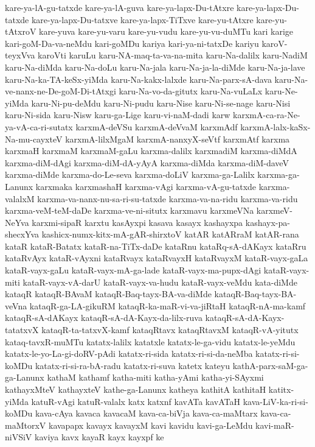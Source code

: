 {kare-ya-lA-gu-tatxde
kare-ya-lA-guva
kare-ya-lapx-Du-tAtxre
kare-ya-lapx-Du-tatxde
kare-ya-lapx-Du-tatxve
kare-ya-lapx-TiTxve
kare-yu-tAtxre
kare-yu-tAtxroV
kare-yuva
kare-yu-varu
kare-yu-vudu
kare-yu-vu-duMTu
kari
karige
kari-goM-Da-va-neMdu
kari-goMDu
kariya
kari-ya-ni-tatxDe
kariyu
karoV-teyxVva
karoVti
karuLu
karu-NA-maq-ta-va-na-mita
karu-Na-dalilx
karu-NadiM
karu-Na-diMda
karu-Na-doLu
karu-Na-jala
karu-Na-ja-la-diMde
karu-Na-ja-lave
karu-Na-ka-TA-keSx-yiMda
karu-Na-kakx-lalxde
karu-Na-parx-sA-dava
karu-Na-ve-nanx-ne-De-goM-Di-tAtxgi
karu-Na-vo-da-gitutx
karu-Na-vuLaLx
karu-Ne-yiMda
karu-Ni-pu-deMdu
karu-Ni-pudu
karu-Nise
karu-Ni-se-nage
karu-Nisi
karu-Ni-sida
karu-Nisw
karu-ga-Lige
karu-vi-naM-dadi
karw
karxmA-ca-ra-Ne-ya-vA-ca-ri-sutatx
karxmA-deVSu
karxmA-deVvaM
karxmAdf
karxmA-lalx-kaSx-Na-mu-cayxteV
karxmA-lilxMgaM
karxmA-nanxyX-seVtf
karxmAtf
karxma
karxmaH
karxmaM
karxmaM-gaLu
karxma-dalilx
karxmadiM
karxma-diMdA
karxma-diM-dAgi
karxma-diM-dA-yAyA
karxma-diMda
karxma-diM-daveV
karxma-diMde
karxma-do-Le-seva
karxma-doLiV
karxma-ga-Lalilx
karxma-ga-Lanunx
karxmaka
karxmashaH
karxma-vAgi
karxma-vA-gu-tatxde
karxma-valalxM
karxma-va-nanx-nu-sa-ri-su-tatxde
karxma-va-na-ridu
karxma-va-ridu
karxma-veM-teM-daDe
karxma-ve-ni-situtx
karxmavu
karxmeVNa
karxmeV-NeYva
karxmi-sipaR
karxtu
kasAyxpi
kasava
kasayx
kashayxpa
kashayx-pa-shecxYva
kashicx-numx-kitx-mA-gAR-shirxtoV
katAR
katARraM
katAR-rana
kataR
kataR-Batatx
kataR-na-TiTx-daDe
kataRnu
kataRq-sA-dAKayx
kataRru
kataRvAyx
kataR-vAyxni
kataRvayx
kataRvayxH
kataRvayxM
kataR-vayx-gaLa
kataR-vayx-gaLu
kataR-vayx-mA-ga-lade
kataR-vayx-ma-pupx-dAgi
kataR-vayx-miti
kataR-vayx-vA-darU
kataR-vayx-va-hudu
kataR-vayx-veMdu
kata-diMde
kataqR
kataqR-BAvaM
kataqR-Baq-tayx-BA-va-diMde
kataqR-Baq-tayx-BA-veVna
kataqR-ga-LA-gikuRM
kataqR-ka-maR-vi-va-jiRtaH
kataqR-nA-ma-kamf
kataqR-sA-dAKayx
kataqR-sA-dA-Kayx-da-lilx-ruva
kataqR-sA-dA-Kayx-tatatxvX
kataqR-ta-tatxvX-kamf
kataqRtavx
kataqRtavxM
kataqR-vA-yitutx
kataq-tavxR-muMTu
katatx-lalilx
katatxle
katatx-le-ga-vidu
katatx-le-yeMdu
katatx-le-yo-La-gi-doRV-pAdi
katatx-ri-sida
katatx-ri-si-da-neMba
katatx-ri-si-koMDu
katatx-ri-si-ra-bA-radu
katatx-ri-suva
katetx
kateyu
kathA-parx-saM-ga-ga-Lanunx
kathaM
kathamf
katha-miti
katha-yAmi
katha-yi-SAyxmi
kathayxMteV
kathayxteV
kathe-ga-Lanunx
katheya
kathitA
kathitaH
katitx-yiMda
katuR-vAgi
katuR-valalx
katx
katxnf
kavATa
kavATaH
kava-LiV-ka-ri-si-koMDu
kava-cAya
kavaca
kavacaM
kava-ca-biVja
kava-ca-maMtarx
kava-ca-maMtorxV
kavapapx
kavayx
kavayxM
kavi
kavidu
kavi-ga-LeMdu
kavi-maR-niVSiV
kaviya
kavx
kayaR
kayx
kayxpf
ke
}
